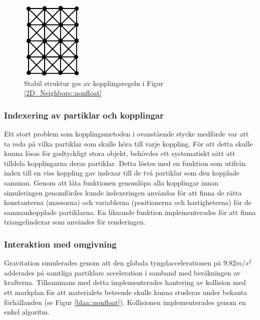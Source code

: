 \documentclass[a4paper,12pt,oneside,final,swedish]{extarticle}
\begin{document}
\begin{figure}[h!]
  \begin{center}
    \includegraphics[width=3cm]{Bilder/2D_stabil.png} 
  \end{center}
  \caption{Stabil struktur ges av kopplingsregeln i Figur \ref{2D_Neighbors::nonfloat} }
  \label{2D_stabil::nonfloat}
\end{figure}

\subsubsection{Indexering av partiklar och kopplingar}
Ett stort problem som kopplingsmetoden i ovanstående stycke medförde var att ta reda på vilka partiklar som skulle höra till varje koppling. För att detta skulle kunna lösas för godtyckligt stora objekt, behövdes ett systematiskt sätt att tilldela kopplingarna deras partiklar. Detta löstes med en funktion som utifrån index till en viss koppling gav indexar till de två partiklar som den kopplade samman. Genom att låta funktionen genomlöpa alla kopplingar innan simuleringen genomfördes kunde indexeringen användas för att finna de rätta konstanterna (massorna) och variablerna (positionerna och hastigheterna) för de sammankopplade partiklarna. En liknande funktion implementerades för att finna triangelindexar som användes för renderingen.

\subsubsection{Interaktion med omgivning}
Gravitation simulerades genom att den globala tyngdaccelerationen på \begin{math}9.82 m/s^2 \end{math} adderades på samtliga partiklars acceleration i samband med beräkningen av krafterna. Tillsammans med detta implementerades hantering av kollision med ett markplan för att materialets beteende skulle kunna studeras under bekanta förhållanden (se Figur \ref{blaa::nonfloat}). Kollisionen implementerades genom en enkel algoritm.
\end{document}
